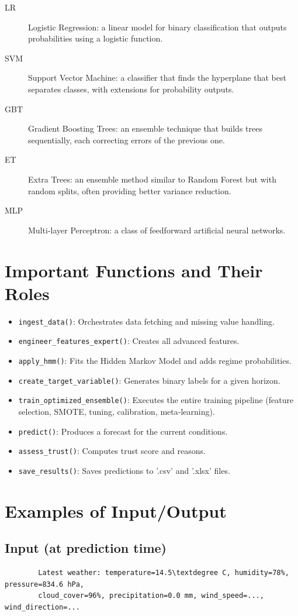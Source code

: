 \documentclass[12pt]{article}
\begin{document}
\begin{description}
		\item[LR] Logistic Regression: a linear model for binary classification that outputs probabilities using a logistic function.
		\item[SVM] Support Vector Machine: a classifier that finds the hyperplane that best separates classes, with extensions for probability outputs.
		\item[GBT] Gradient Boosting Trees: an ensemble technique that builds trees sequentially, each correcting errors of the previous one.
		\item[ET] Extra Trees: an ensemble method similar to Random Forest but with random splits, often providing better variance reduction.
		\item[MLP] Multi‑layer Perceptron: a class of feedforward artificial neural networks.
	\end{description}
	
	\section{Important Functions and Their Roles}
	\begin{itemize}
		\item \texttt{ingest\_data()}: Orchestrates data fetching and missing value handling.
		\item \texttt{engineer\_features\_expert()}: Creates all advanced features.
		\item \texttt{apply\_hmm()}: Fits the Hidden Markov Model and adds regime probabilities.
		\item \texttt{create\_target\_variable()}: Generates binary labels for a given horizon.
		\item \texttt{train\_optimized\_ensemble()}: Executes the entire training pipeline (feature selection, SMOTE, tuning, calibration, meta‑learning).
		\item \texttt{predict()}: Produces a forecast for the current conditions.
		\item \texttt{assess\_trust()}: Computes trust score and reasons.
		\item \texttt{save\_results()}: Saves predictions to '.csv' and '.xlsx' files.
	\end{itemize}
	
	\section{Examples of Input/Output}
	\subsection*{Input (at prediction time)}
	\begin{lstlisting}
		Latest weather: temperature=14.5\textdegree C, humidity=78%, pressure=834.6 hPa,
		cloud_cover=96%, precipitation=0.0 mm, wind_speed=..., wind_direction=...
	\end{lstlisting}
	
\end{document}

